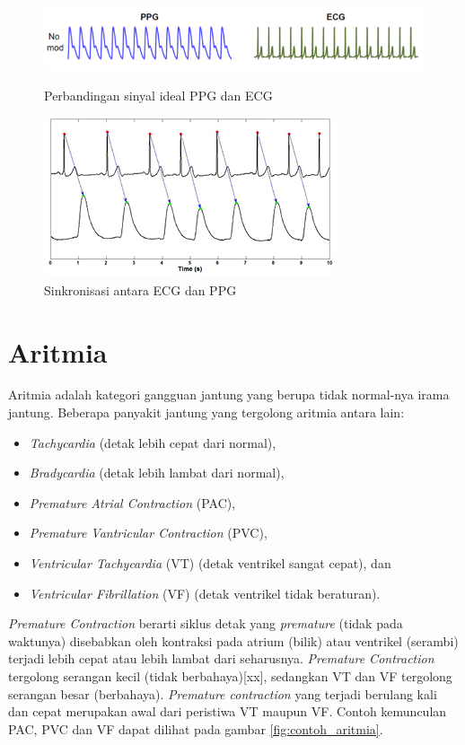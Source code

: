 \begin{figure}[H]
    \centering
    \includegraphics[scale=0.6]{images/ecg_vs_ppg.png}
    \caption{Perbandingan sinyal ideal PPG dan ECG}
    \label{fig:ecg_vs_ppg}
	\includegraphics[scale=0.8]{images/sinkronisasi.jpg}
    \caption{Sinkronisasi antara ECG dan PPG}
    \label{fig:ecg_vs_ppg2}
\end{figure}

\section{Aritmia}
Aritmia adalah kategori gangguan jantung yang berupa tidak normal-nya irama jantung. Beberapa panyakit jantung yang tergolong aritmia antara lain:
\begin{itemize}
	\item \textit{Tachycardia} (detak lebih cepat dari normal),
	\item \textit{Bradycardia} (detak lebih lambat dari normal),
	\item \textit{Premature Atrial Contraction} (PAC),
	\item \textit{Premature Vantricular Contraction} (PVC),
	\item \textit{Ventricular Tachycardia} (VT) (detak ventrikel sangat cepat), dan
	\item \textit{Ventricular Fibrillation} (VF) (detak ventrikel tidak beraturan).
\end{itemize}

\textit{Premature Contraction} berarti siklus detak yang \textit{premature} (tidak pada waktunya) disebabkan oleh kontraksi pada atrium (bilik) atau ventrikel (serambi) terjadi lebih cepat atau lebih lambat dari seharusnya. \textit{Premature Contraction} tergolong serangan kecil (tidak berbahaya)[xx], sedangkan VT dan VF tergolong serangan besar (berbahaya). \textit{Premature contraction} yang terjadi berulang kali dan cepat merupakan awal dari peristiwa VT maupun VF. Contoh kemunculan PAC, PVC dan VF dapat dilihat pada gambar \ref{fig:contoh_aritmia}.

